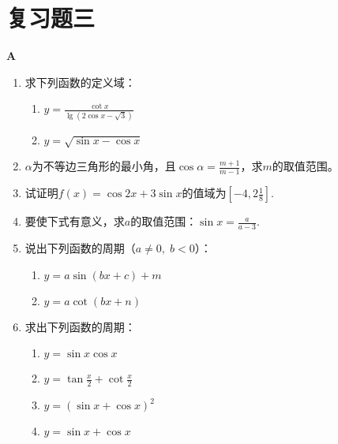 \section*{复习题三}
\begin{center}
    \bfseries A
\end{center}
\begin{enumerate}
    \item 求下列函数的定义域： 
\begin{multicols}{2}
\begin{enumerate}[(1)]
    \item $y=\frac{\cot x}{\lg(2\cos x-\sqrt{3})}$
    \item $y=\sqrt{\sin x-\cos x}$
\end{enumerate}
\end{multicols}

\item $\alpha$为不等边三角形的最小角，且$\cos\alpha=\frac{m+1}{m-1}$，求$m$的取值范围。
\item 试证明$f(x)=\cos2x+3\sin x$的值域为$\left[-4,2\frac{1}{8}\right]$.
\item 要使下式有意义，求$a$的取值范围：$\sin x=\frac{a}{a-3}$.
\item 说出下列函数的周期（$a\ne 0,\; b<0$）：
\begin{multicols}{2}
\begin{enumerate}[(1)]
    \item $y=a\sin(bx+c)+m$
    \item $y=a\cot (bx+n)$
\end{enumerate}
\end{multicols}
\item 求出下列函数的周期：
\begin{multicols}{2}
\begin{enumerate}[(1)]
    \item $y=\sin x\cos x$
    \item $y=\tan\frac{x}{2}+\cot\frac{x}{2}$
    \item $y=(\sin x+\cos x)^2$
    \item $y=\sin x+\cos x$
\end{enumerate}
\end{multicols}


\end{enumerate}
